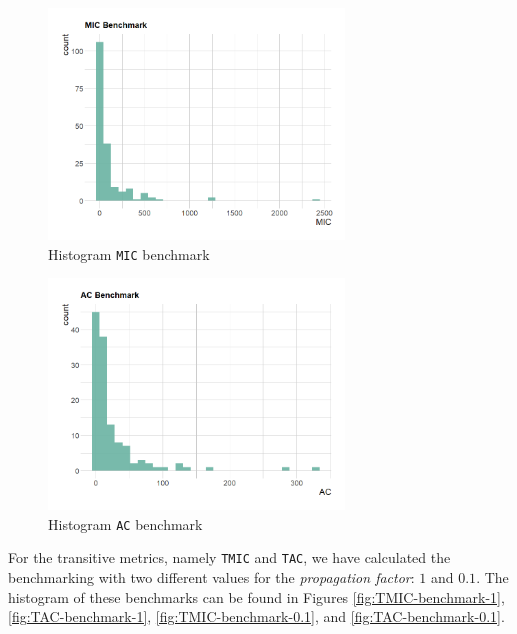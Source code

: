 \begin{figure}[ht!]
\begin{center}
  \includegraphics[width=0.7\textwidth]{figures/benchmark/MIC_benchmark.png}
  \caption{Histogram \texttt{MIC} benchmark}
  \label{fig:MIC-benchmark}
\end{center}
\end{figure}

\begin{figure}[ht!]
\begin{center}
\includegraphics[width=0.7\textwidth]{figures/benchmark/AC_benchmark.png}
\caption{Histogram \texttt{AC} benchmark}
\label{fig:AC-benchmark}
\end{center}
\end{figure}

For the transitive metrics, namely \texttt{TMIC} and \texttt{TAC}, we have calculated the benchmarking with two different values for the \textit{propagation factor}: $1$ and $0.1$. The histogram of these benchmarks can be found in Figures \ref{fig:TMIC-benchmark-1}, \ref{fig:TAC-benchmark-1}, \ref{fig:TMIC-benchmark-0.1}, and \ref{fig:TAC-benchmark-0.1}.

